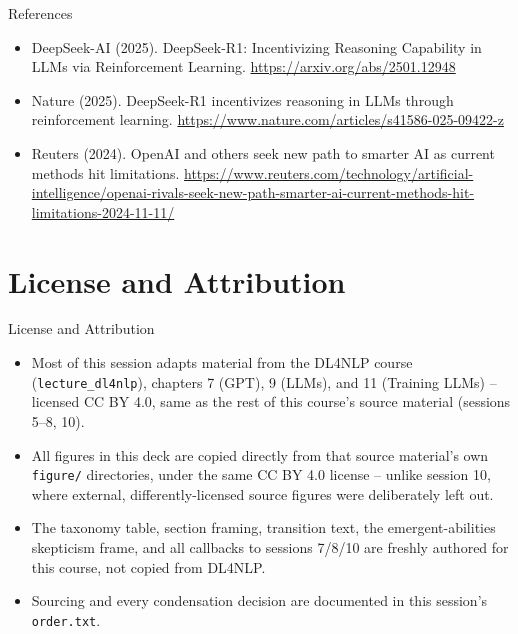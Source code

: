 \begin{vbframe}{References}
\begin{itemize}
\item DeepSeek-AI (2025). DeepSeek-R1: Incentivizing Reasoning Capability in LLMs via Reinforcement Learning. \url{https://arxiv.org/abs/2501.12948}
\item Nature (2025). DeepSeek-R1 incentivizes reasoning in LLMs through reinforcement learning. \url{https://www.nature.com/articles/s41586-025-09422-z}
\item Reuters (2024). OpenAI and others seek new path to smarter AI as current methods hit limitations. \url{https://www.reuters.com/technology/artificial-intelligence/openai-rivals-seek-new-path-smarter-ai-current-methods-hit-limitations-2024-11-11/}
\end{itemize}
\end{vbframe}


\section{License and Attribution}

\begin{vbframe}{License and Attribution}
\begin{itemize}
  \item Most of this session adapts material from the DL4NLP course (\texttt{lecture\_dl4nlp}), chapters 7 (GPT), 9 (LLMs), and 11 (Training LLMs) -- licensed CC BY 4.0, same as the rest of this course's source material (sessions 5--8, 10).
  \item All figures in this deck are copied directly from that source material's own \texttt{figure/} directories, under the same CC BY 4.0 license -- unlike session 10, where external, differently-licensed source figures were deliberately left out.
  \item The taxonomy table, section framing, transition text, the emergent-abilities skepticism frame, and all callbacks to sessions 7/8/10 are freshly authored for this course, not copied from DL4NLP.
  \item Sourcing and every condensation decision are documented in this session's \texttt{order.txt}.
\end{itemize}
\end{vbframe}

\endlecture

